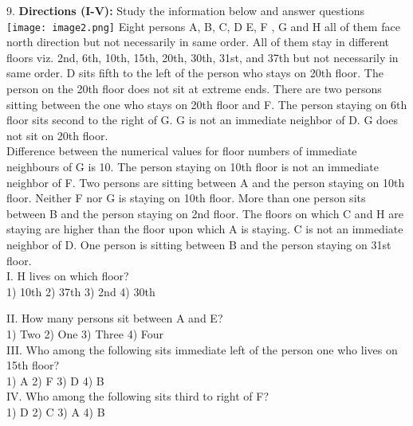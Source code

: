 \documentclass[
]{article}
\begin{document}
9. \textbf{Directions (I-V):} Study the information below and answer questions\\
\texttt{[image: image2.png]}
Eight persons A, B, C, D E, F , G and H all of them face north direction but not necessarily in
same order. All of them stay in different floors viz. 2nd, 6th, 10th, 15th, 20th, 30th, 31st, and
37th but not necessarily in same order. D sits fifth to the left of the person who stays on 20th
floor. The person on the 20th floor does not sit at extreme ends. There are two persons
sitting between the one who stays on 20th floor and F. The person staying on 6th floor sits
second to the right of G. G is not an immediate neighbor of D. G does not sit on 20th floor.\\
Difference between the numerical values for floor numbers of immediate neighbours of G is
10. The person staying on 10th floor is not an immediate neighbor of F. Two persons are
sitting between A and the person staying on 10th floor. Neither F nor G is staying on 10th
floor. More than one person sits between B and the person staying on 2nd floor. The floors
on which C and H are staying are higher than the floor upon which A is staying. C is not an
immediate neighbor of D. One person is sitting between B and the person staying on 31st
floor.\\

I. H lives on which floor?\\
1) 10th \hspace{2mm}2) 37th \hspace{2mm}3) 2nd \hspace{2mm}4) 30th

II. How many persons sit between A and E?\\
1) Two \hspace{2mm}2) One \hspace{2mm}3) Three \hspace{2mm}4) Four\\

III. Who among the following sits immediate left of the person one who lives on 15th floor?\\
1) A \hspace{2mm}2) F \hspace{2mm}3) D \hspace{2mm}4) B\\

IV. Who among the following sits third to right of F?\\
1) D \hspace{2mm}2) C \hspace{2mm}3) A \hspace{2mm}4) B\\
\end{document}
